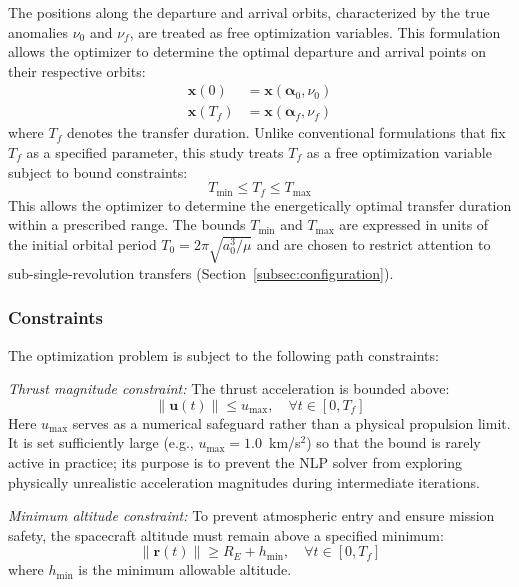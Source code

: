 \documentclass[a4paper,fleqn]{cas-dc}
\begin{document}
The positions along the departure and arrival orbits, characterized by the true anomalies $\nu_0$ and $\nu_f$, are treated as free optimization variables. This formulation allows the optimizer to determine the optimal departure and arrival points on their respective orbits:
\begin{align}
\mathbf{x}(0) &= \mathbf{x}(\boldsymbol{\alpha}_0, \nu_0) \\
\mathbf{x}(T_f) &= \mathbf{x}(\boldsymbol{\alpha}_f, \nu_f)
\end{align}
where $T_f$ denotes the transfer duration. Unlike conventional formulations that fix $T_f$ as a specified parameter, this study treats $T_f$ as a free optimization variable subject to bound constraints:
\begin{equation}\label{eq:tf_bounds}
T_{\min} \leq T_f \leq T_{\max}
\end{equation}
This allows the optimizer to determine the energetically optimal transfer duration within a prescribed range. The bounds $T_{\min}$ and $T_{\max}$ are expressed in units of the initial orbital period $T_0 = 2\pi\sqrt{a_0^3/\mu}$ and are chosen to restrict attention to sub-single-revolution transfers (Section~\ref{subsec:configuration}).

\subsubsection{Constraints}

The optimization problem is subject to the following path constraints:

\textit{Thrust magnitude constraint:} The thrust acceleration is bounded above:
\begin{equation}
\|\mathbf{u}(t)\| \leq u_{\max}, \quad \forall t \in [0, T_f]
\end{equation}
Here $u_{\max}$ serves as a numerical safeguard rather than a physical propulsion limit. It is set sufficiently large (e.g., $u_{\max} = 1.0$~km/s$^2$) so that the bound is rarely active in practice; its purpose is to prevent the NLP solver from exploring physically unrealistic acceleration magnitudes during intermediate iterations.

\textit{Minimum altitude constraint:} To prevent atmospheric entry and ensure mission safety, the spacecraft altitude must remain above a specified minimum:
\begin{equation}
\|\mathbf{r}(t)\| \geq R_E + h_{\min}, \quad \forall t \in [0, T_f]
\end{equation}
where $h_{\min}$ is the minimum allowable altitude.
\end{document}

